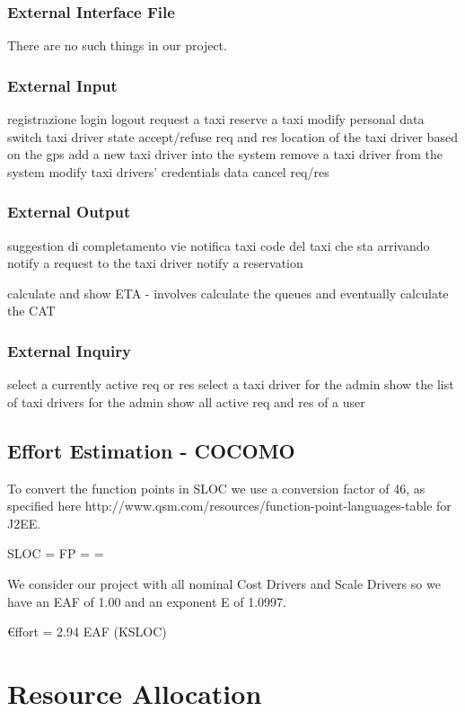 \documentclass{article}
\begin{document}
\subsubsection{External Interface File}
There are no such things in our project.
\subsubsection{External Input}
registrazione
login
logout
request a taxi
reserve a taxi
modify personal data
switch taxi driver state
accept/refuse req and res
location of the taxi driver based on the gps
add a new taxi driver into the system
remove a taxi driver from the system
modify taxi drivers' credentials data
cancel req/res
\subsubsection{External Output}
suggestion di completamento vie
notifica taxi code del taxi che sta arrivando
notify a request to the taxi driver
notify a reservation

calculate and show ETA - involves calculate the queues and eventually calculate the CAT
\subsubsection{External Inquiry}
select a currently active req or res
select a taxi driver for the admin
show the list of taxi drivers for the admin
show all active req and res of a user
\subsection{Effort Estimation - COCOMO}
To convert the function points in SLOC we use a 
conversion factor of 46, as specified here 
http://www.qsm.com/resources/function-point-languages-table
for J2EE.
\begin{center}
	SLOC = FP  =  = %
\end{center}
We consider our project with all nominal Cost Drivers and
Scale Drivers so we have an EAF of 1.00 and an
exponent E of 1.0997.
\begin{center}
	€ffort = 2.94 \texttimes EAF \texttimes (KSLOC)
\end{center}
\section{Resource Allocation}
\end{document}
